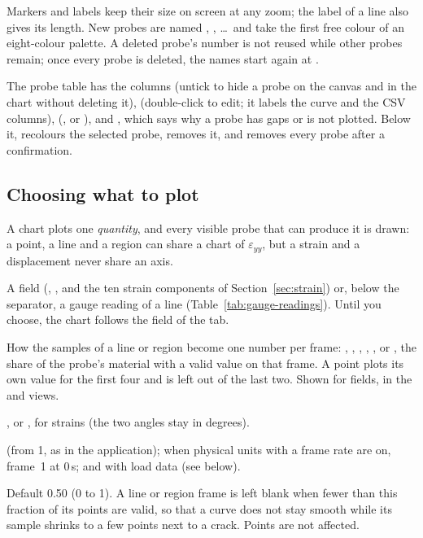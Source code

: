 Markers and labels keep their size on screen at any zoom; the label of a line also gives its
length. New probes are named , , \ldots\ and take the first free colour of an
eight-colour palette. A deleted probe's number is not reused while other probes remain; once every
probe is deleted, the names start again at .

The probe table has the columns  (untick to hide a probe on the canvas and in the chart
without deleting it),  (double-click to edit; it labels the curve and the CSV columns),
 (,  or ),  and , which says why a
probe has gaps or is not plotted. Below it,  recolours the selected probe, 
removes it, and  removes every probe after a confirmation.

\subsection{Choosing what to plot}

A chart plots one \emph{quantity}, and every visible probe that can produce it is drawn: a point, a
line and a region can share a chart of $\varepsilon_{yy}$, but a strain and a displacement never
share an axis.

\begin{description}[leftmargin=0.6cm,style=nextline]
  \item[Plot]
    A field (, ,  and the ten
    strain components of Section~\ref{sec:strain}) or, below the separator, a gauge reading of a
    line (Table~\ref{tab:gauge-readings}). Until you choose, the chart follows the field of the
     tab.
  \item[Statistic]
    How the samples of a line or region become one number per frame: , ,
    , , , or , the share of the
    probe's material with a valid value on that frame. A point plots its own value for the first
    four and is left out of the last two. Shown for fields, in the  and
     views.
  \item[Strain as] , \ui{\%} or , for strains (the two angles stay in degrees).
  \item[X axis]
     (from 1, as in the application);  when physical units with a frame rate
    are on, frame~1 at 0\,s;  and  with load data (see below).
  \item[Min. valid fraction]
    Default 0.50 (0 to 1). A line or region frame is left blank when fewer than this fraction of its
    points are valid, so that a curve does not stay smooth while its sample shrinks to a few points
    next to a crack. Points are not affected.
\end{description}

